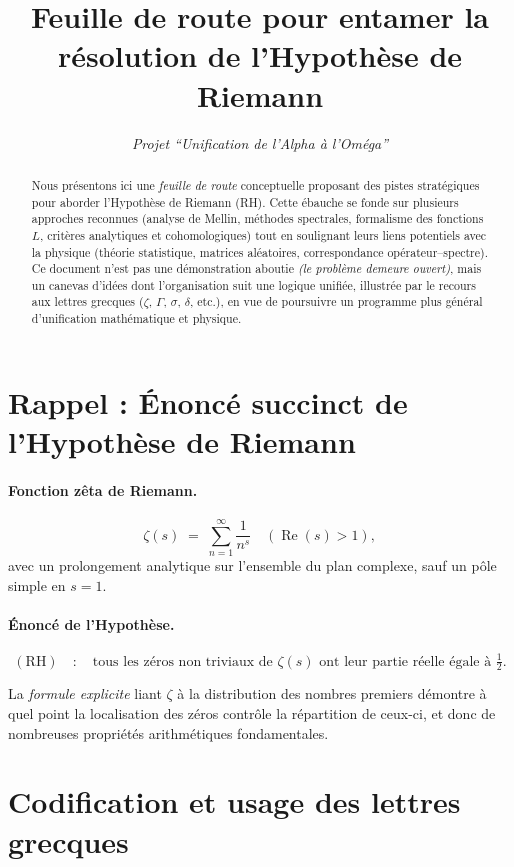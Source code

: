 \documentclass[11pt]{article}
\title{\textbf{Feuille de route pour entamer la résolution de l'Hypothèse de Riemann}}
\author{\textit{Projet “Unification de l’Alpha à l’Oméga”}}
\date{}
\begin{document}
\maketitle

\begin{abstract}
Nous présentons ici une \emph{feuille de route} conceptuelle proposant des pistes stratégiques pour aborder l'Hypothèse de Riemann (RH). Cette ébauche se fonde sur plusieurs approches reconnues (analyse de Mellin, méthodes spectrales, formalisme des fonctions $L$, critères analytiques et cohomologiques) tout en soulignant leurs liens potentiels avec la physique (théorie statistique, matrices aléatoires, correspondance opérateur--spectre). Ce document n'est pas une démonstration aboutie \emph{(le problème demeure ouvert)}, mais un canevas d'idées dont l'organisation suit une logique unifiée, illustrée par le recours aux lettres grecques (\(\zeta\), \(\Gamma\), \(\sigma\), \(\delta\), etc.), en vue de poursuivre un programme plus général d'unification mathématique et physique.
\end{abstract}

\section{Rappel : Énoncé succinct de l'Hypothèse de Riemann}

\paragraph{Fonction zêta de Riemann.}
\[
  \zeta(s) \;=\; \sum_{n=1}^{\infty} \frac{1}{n^s}
  \quad(\operatorname{Re}(s) > 1),
\]
avec un prolongement analytique sur l'ensemble du plan complexe, sauf un pôle simple en $s=1$.

\paragraph{Énoncé de l'Hypothèse.}
\[
  (\mathrm{RH}) \quad:\quad
  \text{tous les zéros non triviaux de }\zeta(s)\text{ 
  ont leur partie réelle égale à }\tfrac12.
\]

La \emph{formule explicite} liant $\zeta$ à la distribution des nombres premiers démontre à quel point la localisation des zéros contrôle la répartition de ceux-ci, et donc de nombreuses propriétés arithmétiques fondamentales.

\section{Codification et usage des lettres grecques}
\end{document}
